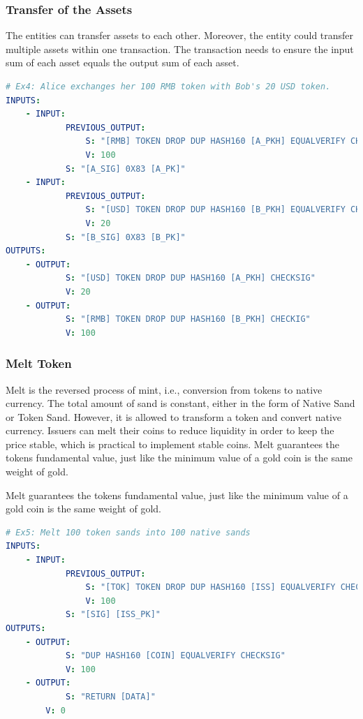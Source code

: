 \documentclass[a4paper,11pt]{article}
\begin{document}
\subsubsection{Transfer of the Assets}

The entities can transfer assets to each other. Moreover, the entity could transfer multiple assets within one transaction. The transaction needs to ensure the input sum of each asset equals the output sum of each asset.

\lstset{basicstyle=\tiny,style=myListStyle}
\begin{lstlisting}[language=yaml, numbers=none,basicstyle=\footnotesize]
# Ex4: Alice exchanges her 100 RMB token with Bob's 20 USD token.
INPUTS:
	- INPUT:
			PREVIOUS_OUTPUT:
				S: "[RMB] TOKEN DROP DUP HASH160 [A_PKH] EQUALVERIFY CHECKSIG"
				V: 100
			S: "[A_SIG] 0X83 [A_PK]"
	- INPUT:
			PREVIOUS_OUTPUT:
				S: "[USD] TOKEN DROP DUP HASH160 [B_PKH] EQUALVERIFY CHECKSIG"
				V: 20
			S: "[B_SIG] 0X83 [B_PK]"
OUTPUTS:
	- OUTPUT:
			S: "[USD] TOKEN DROP DUP HASH160 [A_PKH] CHECKSIG"
			V: 20
	- OUTPUT:
			S: "[RMB] TOKEN DROP DUP HASH160 [B_PKH] CHECKIG"
			V: 100
\end{lstlisting}


\subsubsection{Melt Token}

Melt is the reversed process of mint, i.e., conversion from tokens to native currency. The total amount of sand is constant, either in the form of Native Sand or Token Sand. However, it is allowed to transform a token and convert native currency. Issuers can melt their coins to reduce liquidity in order to keep the price stable, which is practical to implement stable coins. Melt guarantees the tokens fundamental value, just like the minimum value of a gold coin is the same weight of gold.   


Melt guarantees the tokens fundamental value, just like the minimum value of a gold coin is the same weight of gold.

\lstset{basicstyle=\tiny,style=myListStyle}
\begin{lstlisting}[language=yaml, numbers=none,basicstyle=\footnotesize]
# Ex5: Melt 100 token sands into 100 native sands
INPUTS:
	- INPUT:
			PREVIOUS_OUTPUT:
				S: "[TOK] TOKEN DROP DUP HASH160 [ISS] EQUALVERIFY CHECKSIG"
				V: 100
			S: "[SIG] [ISS_PK]"
OUTPUTS:
	- OUTPUT:
			S: "DUP HASH160 [COIN] EQUALVERIFY CHECKSIG"
			V: 100
	- OUTPUT:
			S: "RETURN [DATA]"
		V: 0
\end{lstlisting}
\end{document}
